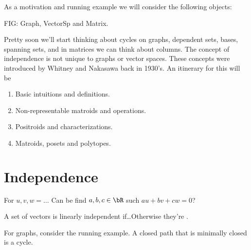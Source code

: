 As a motivation and running example we will consider the following objects:

FIG: Graph, VectorSp and Matrix.

Pretty soon we'll start thinking about cycles on graphs, dependent sets, bases, spanning sets, and in matrices we can think about columns. The concept of independence is not unique to graphs or vector spaces. These concepts were introduced by Whitney and Nakasawa back in 1930's. An itinerary for this will be 
\begin{enumerate}
    \item Basic intuitions and definitions.
    \item Non-representable matroids and operations.
    \item Positroids and characterizations.
    \item Matroids, posets and polytopes.
\end{enumerate}

\section{Independence}

\begin{Ex}
    For \(u,v,w=\dots\) Can be find \(a,b,c\in\bR\) such \(au+bv+cw=0\)? 
\end{Ex}

\begin{Def}
    A set of vectors is linearly independent if\dots Otherwise they're .
\end{Def}

For graphs, consider the running example. A closed path that is minimally closed is a cycle. 
